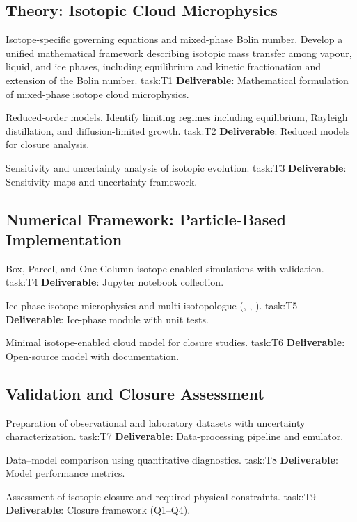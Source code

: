 \subsection{Theory: Isotopic Cloud Microphysics}

\begin{tasks}
    \taskitem
    {Isotope-specific governing equations and mixed-phase Bolin number.
    Develop a unified mathematical framework describing isotopic mass transfer
    among vapour, liquid, and ice phases, including equilibrium and kinetic
    fractionation and extension of the Bolin number.}
    {task:T1}
    \textbf{Deliverable}: Mathematical formulation of mixed-phase isotope cloud microphysics.

    \taskitem
    {Reduced-order models. Identify limiting regimes including equilibrium,
    Rayleigh distillation, and diffusion-limited growth.}
    {task:T2}
    \textbf{Deliverable}: Reduced models for closure analysis.

    \taskitem
    {Sensitivity and uncertainty analysis of isotopic evolution.}
    {task:T3}
    \textbf{Deliverable}: Sensitivity maps and uncertainty framework.
\end{tasks}


\subsection{Numerical Framework: Particle-Based Implementation}

\begin{tasks}
    \taskitem
    {Box, Parcel, and One-Column isotope-enabled simulations with validation.}
    {task:T4}
    \textbf{Deliverable}: Jupyter notebook collection.
    
    \taskitem
    {Ice-phase isotope microphysics and multi-isotopologue (, , ).}
    {task:T5}
    \textbf{Deliverable}: Ice-phase module with unit tests.
    
    \taskitem
    {Minimal isotope-enabled cloud model for closure studies.}
    {task:T6}
    \textbf{Deliverable}: Open-source model with documentation.
\end{tasks}

\subsection{Validation and Closure Assessment}

\begin{tasks}
    \taskitem
    {Preparation of observational and laboratory datasets with uncertainty characterization.}
    {task:T7}
    \textbf{Deliverable}: Data-processing pipeline and emulator.
    
    \taskitem
    {Data--model comparison using quantitative diagnostics.}
    {task:T8}
    \textbf{Deliverable}: Model performance metrics.
    
    \taskitem
    {Assessment of isotopic closure and required physical constraints.}
    {task:T9}
    \textbf{Deliverable}: Closure framework (Q1–Q4).
\end{tasks}



